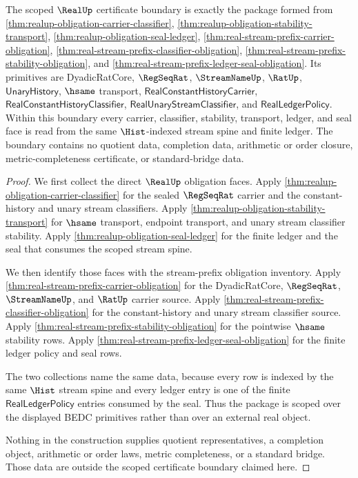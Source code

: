 \begin{theorem}
\label{thm:realup-scoped-certificate-boundary}
The scoped $\RealUp$ certificate boundary is exactly the package formed from
\autoref{thm:realup-obligation-carrier-classifier},
\autoref{thm:realup-obligation-stability-transport},
\autoref{thm:realup-obligation-seal-ledger},
\autoref{thm:real-stream-prefix-carrier-obligation},
\autoref{thm:real-stream-prefix-classifier-obligation},
\autoref{thm:real-stream-prefix-stability-obligation}, and
\autoref{thm:real-stream-prefix-ledger-seal-obligation}. Its primitives are
DyadicRatCore, $\RegSeqRat$, $\StreamNameUp$, $\RatUp$,
$\mathsf{UnaryHistory}$, $\hsame$ transport,
$\mathsf{RealConstantHistoryCarrier}$,
$\mathsf{RealConstantHistoryClassifier}$,
$\mathsf{RealUnaryStreamClassifier}$, and $\mathsf{RealLedgerPolicy}$.
Within this boundary every carrier, classifier, stability, transport, ledger,
and seal face is read from the same $\Hist$-indexed stream spine and finite
ledger. The boundary contains no quotient data, completion data, arithmetic or
order closure, metric-completeness certificate, or standard-bridge data.
\end{theorem}
\begin{proof}
We first collect the direct $\RealUp$ obligation faces. Apply
\autoref{thm:realup-obligation-carrier-classifier} for the sealed
$\RegSeqRat$ carrier and the constant-history and unary stream classifiers.
Apply \autoref{thm:realup-obligation-stability-transport} for $\hsame$
transport, endpoint transport, and unary stream classifier stability. Apply
\autoref{thm:realup-obligation-seal-ledger} for the finite ledger and the seal
that consumes the scoped stream spine.

We then identify those faces with the stream-prefix obligation inventory.
Apply \autoref{thm:real-stream-prefix-carrier-obligation} for the
DyadicRatCore, $\RegSeqRat$, $\StreamNameUp$, and $\RatUp$ carrier source.
Apply \autoref{thm:real-stream-prefix-classifier-obligation} for the
constant-history and unary stream classifier source. Apply
\autoref{thm:real-stream-prefix-stability-obligation} for the pointwise
$\hsame$ stability rows. Apply
\autoref{thm:real-stream-prefix-ledger-seal-obligation} for the finite
ledger policy and seal rows.

The two collections name the same data, because every row is indexed by the
same $\Hist$ stream spine and every ledger entry is one of the finite
$\mathsf{RealLedgerPolicy}$ entries consumed by the seal. Thus the package is
scoped over the displayed BEDC primitives rather than over an external real
object.

Nothing in the construction supplies quotient representatives, a completion
object, arithmetic or order laws, metric completeness, or a standard bridge.
Those data are outside the scoped certificate boundary claimed here.
\end{proof}

